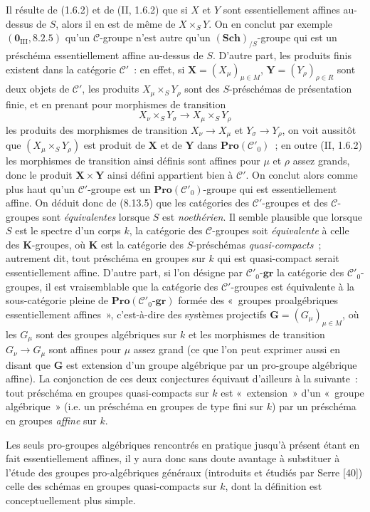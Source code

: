 \begin{remark}[8.13.6]
\label{IV.8.13.6-fr}
Il résulte de (1.6.2) et de (II, 1.6.2) que si $X$ et $Y$ sont
essentiellement affines au-dessus de $S$, alors il en est de même de
$X\times_S Y$. On en conclut par exemple $(\mathbf 0_{\mathrm{III}},8.2.5)$
qu'un $\mathcal C$-groupe n'est autre qu'un $(\mathbf{Sch})_{/S}$-groupe qui
est un préschéma essentiellement affine au-dessus de $S$. D'autre part, les
produits finis existent dans la catégorie $\mathcal C'$~: en effet, si
$\mathbf X=(X_\mu)_{\mu\in M}$, $\mathbf Y=(Y_\rho)_{\rho\in R}$ sont deux
objets de $\mathcal C'$, les produits $X_\mu\times_S Y_\rho$ sont des
$S$-préschémas de présentation finie, et en prenant pour morphismes de
transition
\[
X_\nu\times_S Y_\sigma\longrightarrow X_\mu\times_S Y_\rho
\]
les produits des morphismes de transition $X_\nu\to X_\mu$ et
$Y_\sigma\to Y_\rho$, on voit aussitôt que
$(X_\mu\times_S Y_\rho)$ est produit de $\mathbf X$ et de $\mathbf Y$ dans
$\mathbf{Pro}(\mathcal C'_0)$~; en outre (II, 1.6.2) les morphismes de
transition ainsi définis sont affines pour $\mu$ et $\rho$ assez grands, donc
le produit $\mathbf X\times\mathbf Y$ ainsi défini appartient bien à
$\mathcal C'$. On conclut alors comme plus haut qu'un $\mathcal C'$-groupe est
un $\mathbf{Pro}(\mathcal C'_0)$-groupe qui est essentiellement affine. On
déduit donc de (8.13.5) que les catégories des $\mathcal C'$-groupes et des
$\mathcal C$-groupes sont \emph{équivalentes} lorsque $S$ est
\emph{noethérien}. Il semble plausible que lorsque $S$ est le spectre d'un
corps $k$, la catégorie des $\mathcal C$-groupes soit \emph{équivalente} à
celle des $\boldsymbol K$-groupes, où $\boldsymbol K$ est la catégorie des
$S$-préschémas \emph{quasi-compacts}~; autrement dit, tout préschéma en
groupes sur $k$ qui est quasi-compact serait essentiellement affine. D'autre
part, si l'on désigne
par $\mathcal C'_0$-$\boldsymbol{gr}$ la catégorie des
$\mathcal C'_0$-groupes, il est vraisemblable que la catégorie des
$\mathcal C'$-groupes est équivalente à la sous-catégorie pleine de
$\mathbf{Pro}(\mathcal C'_0\text{-}\boldsymbol{gr})$ formée des «~groupes
proalgébriques essentiellement affines~», c'est-à-dire des systèmes
projectifs $\mathbf G=(G_\mu)_{\mu\in M}$, où les $G_\mu$ sont des groupes
algébriques sur $k$ et les morphismes de transition $G_\nu\to G_\mu$ sont
affines pour $\mu$ assez grand (ce que l'on peut exprimer aussi en disant que
$\mathbf G$ est extension d'un groupe algébrique par un pro-groupe algébrique
affine). La conjonction de ces deux conjectures équivaut d'ailleurs à la
suivante~: tout préschéma en groupes quasi-compacts sur $k$ est «~extension~»
d'un «~groupe algébrique~» (i.e. un préschéma en groupes de type fini sur $k$)
par un préschéma en groupes \emph{affine} sur $k$.

Les seuls pro-groupes algébriques rencontrés en pratique jusqu'à présent étant
en fait essentiellement affines, il y aura donc sans doute avantage à
substituer à l'étude des groupes pro-algébriques généraux (introduits et
étudiés par Serre [40]) celle des schémas en groupes quasi-compacts sur $k$,
dont la définition est conceptuellement plus simple.
\end{remark}

